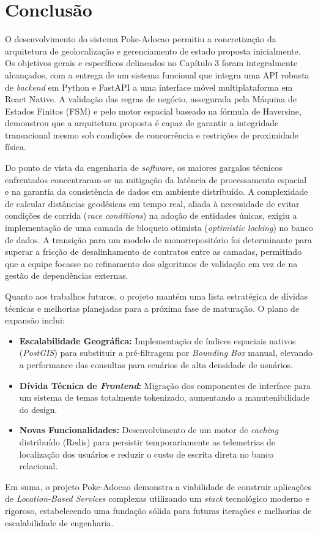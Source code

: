 \chapter{Conclusão}

O desenvolvimento do sistema Poke-Adocao permitiu a concretização da arquitetura de geolocalização e gerenciamento de estado proposta inicialmente. Os objetivos gerais e específicos delineados no Capítulo 3 foram integralmente alcançados, com a entrega de um sistema funcional que integra uma API robusta de \textit{backend} em Python e FastAPI a uma interface móvel multiplataforma em React Native. A validação das regras de negócio, assegurada pela Máquina de Estados Finitos (FSM) e pelo motor espacial baseado na fórmula de Haversine, demonstrou que a arquitetura proposta é capaz de garantir a integridade transacional mesmo sob condições de concorrência e restrições de proximidade física.

Do ponto de vista da engenharia de \textit{software}, os maiores gargalos técnicos enfrentados concentraram-se na mitigação da latência de processamento espacial e na garantia da consistência de dados em ambiente distribuído. A complexidade de calcular distâncias geodésicas em tempo real, aliada à necessidade de evitar condições de corrida (\textit{race conditions}) na adoção de entidades únicas, exigiu a implementação de uma camada de bloqueio otimista (\textit{optimistic locking}) no banco de dados. A transição para um modelo de monorrepositório foi determinante para superar a fricção de desalinhamento de contratos entre as camadas, permitindo que a equipe focasse no refinamento dos algoritmos de validação em vez de na gestão de dependências externas.

Quanto aos trabalhos futuros, o projeto mantém uma lista estratégica de dívidas técnicas e melhorias planejadas para a próxima fase de maturação. O plano de expansão inclui:
\begin{itemize}
    \item \textbf{Escalabilidade Geográfica:} Implementação de índices espaciais nativos (\textit{PostGIS}) para substituir a pré-filtragem por \textit{Bounding Box} manual, elevando a performance das consultas para cenários de alta densidade de usuários.
    \item \textbf{Dívida Técnica de \textit{Frontend}:} Migração dos componentes de interface para um sistema de temas totalmente tokenizado, aumentando a manutenibilidade do design.
    \item \textbf{Novas Funcionalidades:} Desenvolvimento de um motor de \textit{caching} distribuído (Redis) para persistir temporariamente as telemetrias de localização dos usuários e reduzir o custo de escrita direta no banco relacional.
\end{itemize}

Em suma, o projeto Poke-Adocao demonstra a viabilidade de construir aplicações de \textit{Location-Based Services} complexas utilizando um \textit{stack} tecnológico moderno e rigoroso, estabelecendo uma fundação sólida para futuras iterações e melhorias de escalabilidade de engenharia.